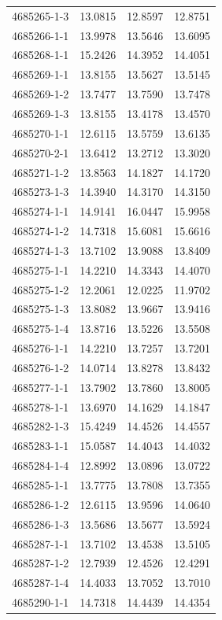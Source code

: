 \begin{longtable}{lrrr}
4685265-1-3 & 13.0815 & 12.8597 & 12.8751 \\
4685266-1-1 & 13.9978 & 13.5646 & 13.6095 \\
4685268-1-1 & 15.2426 & 14.3952 & 14.4051 \\
4685269-1-1 & 13.8155 & 13.5627 & 13.5145 \\
4685269-1-2 & 13.7477 & 13.7590 & 13.7478 \\
4685269-1-3 & 13.8155 & 13.4178 & 13.4570 \\
4685270-1-1 & 12.6115 & 13.5759 & 13.6135 \\
4685270-2-1 & 13.6412 & 13.2712 & 13.3020 \\
4685271-1-2 & 13.8563 & 14.1827 & 14.1720 \\
4685273-1-3 & 14.3940 & 14.3170 & 14.3150 \\
4685274-1-1 & 14.9141 & 16.0447 & 15.9958 \\
4685274-1-2 & 14.7318 & 15.6081 & 15.6616 \\
4685274-1-3 & 13.7102 & 13.9088 & 13.8409 \\
4685275-1-1 & 14.2210 & 14.3343 & 14.4070 \\
4685275-1-2 & 12.2061 & 12.0225 & 11.9702 \\
4685275-1-3 & 13.8082 & 13.9667 & 13.9416 \\
4685275-1-4 & 13.8716 & 13.5226 & 13.5508 \\
4685276-1-1 & 14.2210 & 13.7257 & 13.7201 \\
4685276-1-2 & 14.0714 & 13.8278 & 13.8432 \\
4685277-1-1 & 13.7902 & 13.7860 & 13.8005 \\
4685278-1-1 & 13.6970 & 14.1629 & 14.1847 \\
4685282-1-3 & 15.4249 & 14.4526 & 14.4557 \\
4685283-1-1 & 15.0587 & 14.4043 & 14.4032 \\
4685284-1-4 & 12.8992 & 13.0896 & 13.0722 \\
4685285-1-1 & 13.7775 & 13.7808 & 13.7355 \\
4685286-1-2 & 12.6115 & 13.9596 & 14.0640 \\
4685286-1-3 & 13.5686 & 13.5677 & 13.5924 \\
4685287-1-1 & 13.7102 & 13.4538 & 13.5105 \\
4685287-1-2 & 12.7939 & 12.4526 & 12.4291 \\
4685287-1-4 & 14.4033 & 13.7052 & 13.7010 \\
4685290-1-1 & 14.7318 & 14.4439 & 14.4354 \\

\end{longtable}

